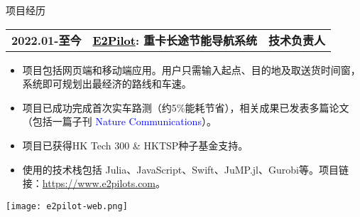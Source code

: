 \documentclass{resume} %
\makeatletter
\newcommand{\trianglebullet}{$\mbox{\ensuremath{\rhd}}$}
\newcommand{\projectheader}[3]{%
  \begin{tabular*}{\linewidth}{@{}l@{\extracolsep{\fill}}l@{\extracolsep{\fill}}r@{}}
    \textbf{#1} & \textbf{#2} & \textbf{#3} \\
  \end{tabular*}%
  \vspace{-0.5em} %
}
\makeatother
\begin{document}

\def\FormatName#1{%
    \def\myname{Junyan Su}%
    \edef\name{#1}%
    \ifx\name\myname
      \underline{#1}%
    \else
       #1%
    \fi
}

\begin{rSection}{项目经历}
    \projectheader{2022.01-至今}{\href{https://www.e2pilots.com/}{\textcolor{black}{E2Pilot}}: 重卡长途节能导航系统}{技术负责人}

    \begin{minipage}[h]{0.65\textwidth} %
         \begin{itemize}
            \item 项目包括网页端和移动端应用。用户只需输入起点、目的地及取送货时间窗，系统即可规划出最经济的路线和车速。%
            \item 项目已成功完成首次实车路测（约5\%能耗节省），相关成果已发表多篇论文（包括一篇子刊 \textcolor{blue}{Nature Communications}）。
            \item 项目已获得HK Tech 300 \& HKTSP种子基金支持。
            \item 使用的技术栈包括 Julia、JavaScript、Swift、JuMP.jl、Gurobi等。项目链接：\href{https://www.e2pilots.com/}{https://www.e2pilots.com}。
        \end{itemize}
    \end{minipage}%
    \hfill %
    \begin{minipage}[h]{0.35\textwidth} %
        \centering
        \texttt{[image: e2pilot-web.png]} %
    \end{minipage}



\end{rSection}
\end{document}
